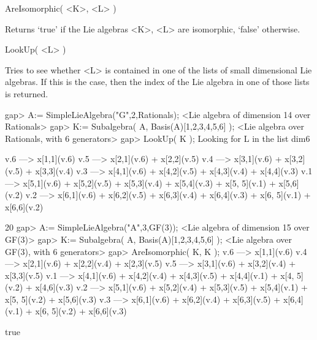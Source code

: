 \>AreIsomorphic( <K>, <L> )

Returns `true' if the Lie algebras <K>, <L> are isomorphic, `false'
otherwise.

\> LookUp( <L> )

Tries to see whether <L> is contained in one of the lists of small 
dimensional Lie algebras. If this is the case, then the index of the 
Lie algebra in one of those lists is returned.

\beginexample
gap> A:= SimpleLieAlgebra("G",2,Rationals);
<Lie algebra of dimension 14 over Rationals>
gap> K:= Subalgebra( A, Basis(A){[1,2,3,4,5,6]} );
<Lie algebra over Rationals, with 6 generators>
gap> LookUp( K );
Looking for L in the list dim6

v.6 ---> x[1,1](v.6) 
v.5 ---> x[2,1](v.6) + x[2,2](v.5) 
v.4 ---> x[3,1](v.6) + x[3,2](v.5) + x[3,3](v.4) 
v.3 ---> x[4,1](v.6) + x[4,2](v.5) + x[4,3](v.4) + x[4,4](v.3) 
v.1 ---> x[5,1](v.6) + x[5,2](v.5) + x[5,3](v.4) + x[5,4](v.3) + x[5,
5](v.1) + x[5,6](v.2) 
v.2 ---> x[6,1](v.6) + x[6,2](v.5) + x[6,3](v.4) + x[6,4](v.3) + x[6,
5](v.1) + x[6,6](v.2) 

20
gap> A:= SimpleLieAlgebra("A",3,GF(3));    
<Lie algebra of dimension 15 over GF(3)>
gap> K:= Subalgebra( A, Basis(A){[1,2,3,4,5,6]} );
<Lie algebra over GF(3), with 6 generators>
gap> AreIsomorphic( K, K );
v.6 ---> x[1,1](v.6) 
v.4 ---> x[2,1](v.6) + x[2,2](v.4) + x[2,3](v.5) 
v.5 ---> x[3,1](v.6) + x[3,2](v.4) + x[3,3](v.5) 
v.1 ---> x[4,1](v.6) + x[4,2](v.4) + x[4,3](v.5) + x[4,4](v.1) + x[4,
5](v.2) + x[4,6](v.3) 
v.2 ---> x[5,1](v.6) + x[5,2](v.4) + x[5,3](v.5) + x[5,4](v.1) + x[5,
5](v.2) + x[5,6](v.3) 
v.3 ---> x[6,1](v.6) + x[6,2](v.4) + x[6,3](v.5) + x[6,4](v.1) + x[6,
5](v.2) + x[6,6](v.3) 

true
\endexample


